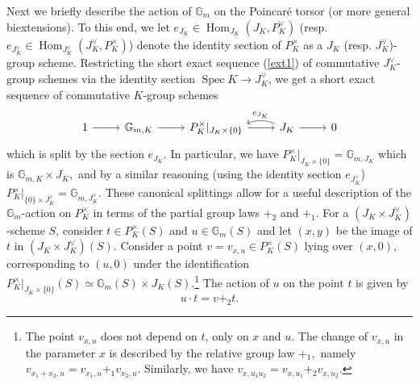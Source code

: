 \documentclass[11pt,oneside]{amsart}
\theoremstyle{plain}
\theoremstyle{definition}
\def\lra{{\longrightarrow}}
\def\G{{\bf G}}
\DeclareMathOperator{\Gm}{\mathbb{G}_m}
\DeclareMathOperator{\Hom}{Hom}
\DeclareMathOperator{\spec}{Spec} \DeclareMathOperator{\sgn}{sign}
\def\G{\mathbb{G}}
\def\ra{\rightarrow}
\def\Gm{{\mathbb{G}_m}}
\begin{document}
Next we briefly describe the action of $\Gm$ on the Poincar\'e torsor (or more general biextensions). To this end, we let $e_{J_K}\in \Hom_{J_K}(J_K, P_K^\vee)$ (resp. $e_{J_K^\vee}\in \Hom_{J_K^\vee}(J_K^\vee, P_K^\times)$) denote the identity section of $P_K^\times$ as a $J_K$ (resp. $J_K^\vee$)-group scheme. 
Restricting the short exact sequence (\ref{ext1}) of commutative $J_K^\vee$-group schemes via the identity section $\spec K \ra J_K^\vee $, we get a short exact sequence of commutative $K$-group schemes 
\[\begin{tikzcd}[bend angle = 20]
1 \arrow{r}
& \G_{m, K} \arrow{r}
& P^\times_{K} \vert_{J_K\times \{ 0 \}} \arrow{r}
& J_K \arrow{r} \arrow[bend right,end anchor={[shift={(0pt,-6pt)}]}]{l}[swap]{e_{J_K}}
& 0
\end{tikzcd}\]
which is split by the section $e_{J_K}$. In particular, we have 
$ P^\times_{K} \vert_{J_K\times \{ 0 \}}=\G_{m, J_K}$ which is $\G_{m, K}\times J_K,$ and by a similar reasoning (using the identity section $e_{J_K^\vee}$) 
$P^\times_{K} \vert_{\{ 0 \} \times J_K^\vee}=\G_{m, J_K^\vee}. $
These canonical splittings  allow for a useful description of the $\G_m$-action on $P^{\times}_K$ in terms of the partial group laws $+_2$ and $+_1$. For a $(J_K\times J_K^\vee)$-scheme $S$, consider $t \in P_K^{\times}(S)$ and $u \in \G_m(S)$ and let $(x, y)$ be the image of $t$ in $(J_K \times J_K^{\vee})(S)$. Consider a point $v=v_{x, u} \in P_K^{\times}(S)$ lying over $(x, 0)$, corresponding to $(u, 0)$ under the identification ${P_K^{\times}}\vert_{J_K \times \{0\}}(S) \simeq \G_m(S) \times J_K(S)$.\footnote{ The point $v_{x, u}$ does not depend on $t$, only on $x$ and $u$. The change of $v_{x, u}$ in the parameter $x$ is described by the relative group law $+_1,$ namely $v_{x_1+x_2, u}=v_{x_1, u}+_1v_{x_2, u}$. Similarly, we have $v_{x, u_1u_2}=v_{x, u_1}+_2v_{x, u_2}$.} 
The action of $u$ on the point $t$ is given by
\begin{equation}\label{rem:internal-Gm-action}
u \cdot t=v+_2 t.
\end{equation}
\end{document}
